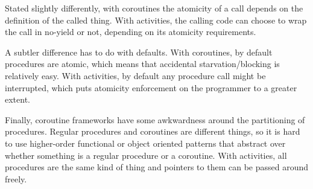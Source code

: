 \documentclass[9pt,preprint]{sigplanconf-2}
\begin{document}
Stated slightly differently, with coroutines the atomicity of a call depends on the definition of the called thing.
With activities, the calling code can choose to wrap the call in no-yield or not, depending on its atomicity requirements.

A subtler difference has to do with defaults.
With coroutines, by default procedures are atomic, which means that accidental starvation/blocking is relatively easy.
With activities, by default any procedure call might be interrupted, which puts atomicity enforcement on the programmer to a greater extent.

Finally, coroutine frameworks have some awkwardness around the partitioning of procedures.
Regular procedures and coroutines are different things, so it is hard to use higher-order functional or object oriented patterns that abstract over whether something is a regular procedure or a coroutine.
With activities, all procedures are the same kind of thing and pointers to them can be passed around freely.



\end{document}

